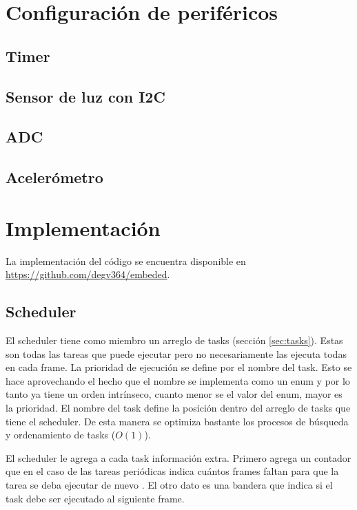 \section{Configuración de periféricos}

\subsection{Timer}

\subsection{Sensor de luz con I2C}


\subsection{ ADC}

\subsection{Acelerómetro}

\section{Implementación}
La implementación del código se encuentra disponible en  \url{https://github.com/degv364/embeded}.


\subsection{Scheduler}
\label{sec:scheduler}
El scheduler tiene como miembro un arreglo de tasks (sección \ref{sec:tasks}). Estas son todas las
tareas que puede ejecutar pero no necesariamente las ejecuta todas en cada frame. La prioridad de
ejecución se define por el nombre del task. Esto se hace aprovechando el hecho que el nombre se
implementa como un enum y por lo tanto ya tiene un orden intrínseco, cuanto menor se el valor del
enum, mayor es la prioridad. El nombre del task define la posición dentro del arreglo de tasks que
tiene el scheduler. De esta manera se optimiza bastante los procesos de búsqueda y ordenamiento de
tasks ($O(1)$).

El scheduler le agrega a cada task información extra. Primero agrega un contador que en el caso de
las tareas periódicas indica cuántos frames faltan para que la tarea se deba ejecutar de nuevo . El
otro dato es una bandera que indica si el task debe ser ejecutado al siguiente frame.

